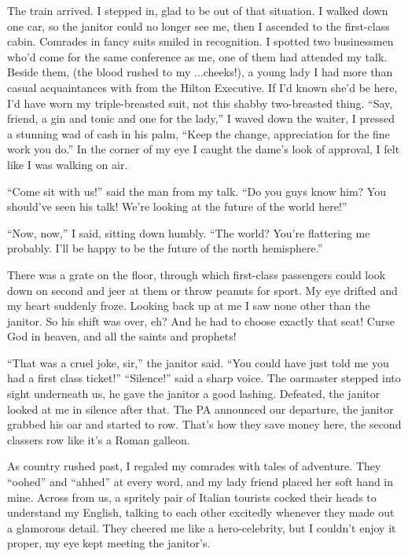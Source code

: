 \documentclass[oneside]{book}
\begin{document}
The train arrived.  I stepped in, glad to be out of that situation.  I walked down one car, so the
janitor could no longer see me, then I ascended to the first-class cabin.  Comrades in fancy suits
smiled in recognition.  I spotted two businessmen who'd come for the same conference as me,
one of them had attended my talk.  Beside them, (the blood rushed to my $\ldots$cheeks!), a young lady I had more
than casual acquaintances with from the Hilton Executive.  If I'd known she'd be here, I'd have worn my
triple-breasted suit, not this shabby two-breasted thing.  ``Say, friend, a gin and tonic and one for the lady,''
I waved down the waiter, I pressed a stunning wad of cash in his palm, ``Keep the change,
appreciation for the fine work you do.''  In the corner of my eye I caught the dame's look of approval,
I felt like I was walking on air.

``Come sit with us!'' said the man from my talk.  ``Do you guys know him?
You should've seen his talk!  We're looking at the future of the world here!''

``Now, now,'' I said, sitting down humbly.  ``The world?  You're flattering me probably.  I'll be happy
to be the future of the north hemisphere.''

There was a grate on the floor, through which first-class passengers could look down on second
and jeer at them or throw peanuts for sport.  My eye drifted and my heart suddenly
froze.  Looking back up at me I saw none other than the janitor.  So his shift was over, eh?  And he had to
choose exactly that seat!  Curse God in heaven, and all the saints and prophets!

``That was a cruel joke, sir,'' the janitor said.  ``You could have just told me you had a first class
ticket!''  ``Silence!'' said a sharp voice.  The oarmaster stepped into sight underneath us, he gave the janitor
a good lashing.  Defeated, the janitor looked at me in silence after that.  The PA announced our departure,
the janitor grabbed his oar and started to row.  That's how they save money here, the second classers row like
it's a Roman galleon.

As country rushed past, I regaled my comrades with tales of adventure.  They ``oohed'' and ``ahhed'' at
every word, and my lady friend placed her soft hand in mine.  Across from us, a spritely pair of
Italian tourists cocked their heads to understand my English, talking to each other excitedly whenever they made
out a glamorous detail.  They cheered me like a hero-celebrity, but I couldn't enjoy it proper,
my eye kept meeting the janitor's.
\end{document}
